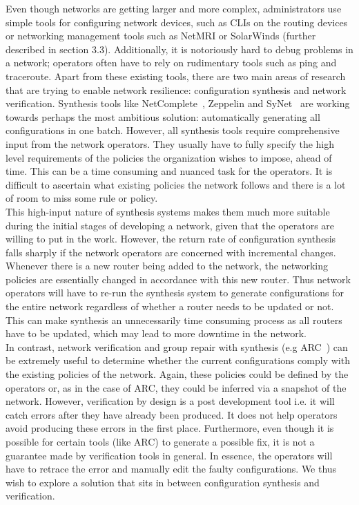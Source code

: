 Even though networks are getting larger and more complex, administrators use simple tools for configuring network devices, such as CLIs on the routing devices or networking management tools such as NetMRI or SolarWinds (further described in section 3.3). Additionally, it is notoriously hard to debug problems in a network; operators often have to rely on rudimentary tools such as ping and traceroute. Apart from these existing tools, there are two main areas of research that are trying to enable network resilience: configuration synthesis and network verification. Synthesis tools like NetComplete~\cite{NetComplete}, Zeppelin and SyNet~\cite{synet} are working towards perhaps the most ambitious solution: automatically generating all configurations in one batch. However, all synthesis tools require comprehensive input from the network operators. They usually have to fully specify the high level requirements of the policies the organization wishes to impose, ahead of time. This can be a time consuming and nuanced task for the operators. It is difficult to ascertain what existing policies the network follows and there is a lot of room to miss some rule or policy.\\

This high-input nature of synthesis systems makes them much more suitable during the initial stages of developing a network, given that the operators are willing to put in the work. However, the return rate of configuration synthesis falls sharply if the network operators are concerned with incremental changes. Whenever there is a new router being added to the network, the networking policies are essentially changed in accordance with this new router. Thus network operators will have to re-run the synthesis system to generate configurations for the entire network regardless of whether a router needs to be updated or not. This can make synthesis an unnecessarily time consuming process as all routers have to be updated, which may lead to more downtime in the network.\\ 

In contrast, network verification and group repair with synthesis (e.g ARC~\cite{arc}) can be extremely useful to determine whether the current configurations comply with the existing policies of the network. Again, these policies could be defined by the operators or, as in the case of ARC, they could be inferred via a snapshot of the network. However, verification by design is a post development tool i.e. it will catch errors after they have already been produced. It does not help operators avoid producing these errors in the first place. Furthermore, even though it is possible for certain tools (like ARC) to generate a possible fix, it is not a guarantee made by verification tools in general. In essence, the operators will have to retrace the error and manually edit the faulty configurations. We thus wish to explore a solution that sits in between configuration synthesis and verification.\\

